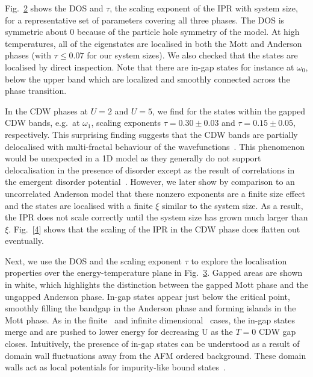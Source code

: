 Fig.~\protect\hyperlink{fig:indiv_IPR}{2} shows the {DOS} and \(\tau\), the scaling exponent of the IPR with system size, for a representative set of parameters covering all three phases. The DOS is symmetric about \(0\) because of the particle hole symmetry of the model. At high temperatures, all of the eigenstates are localised in both the Mott and Anderson phases (with \(\tau \leq 0.07\) for our system sizes). We also checked that the states are localised by direct inspection. Note that there are in-gap states for instance at \(\omega_0\), below the upper band which are localized and smoothly connected across the phase transition.

In the CDW phases at \(U=2\) and \(U=5\), we find for the states within the gapped CDW bands, e.g.~at \(\omega_1\), scaling exponents \(\tau = 0.30\pm0.03\) and \(\tau = 0.15\pm0.05\), respectively. This surprising finding suggests that the CDW bands are partially delocalised with multi-fractal behaviour of the wavefunctions~\autocite{eversAndersonTransitions2008a}. This phenomenon would be unexpected in a 1D model as they generally do not support delocalisation in the presence of disorder except as the result of correlations in the emergent disorder potential~\autocite{croyAndersonLocalization1D2011,goldshteinPurePointSpectrum1977}. However, we later show by comparison to an uncorrelated Anderson model that these nonzero exponents are a finite size effect and the states are localised with a finite \(\xi\) similar to the system size. As a result, the IPR does not scale correctly until the system size has grown much larger than \(\xi\). Fig.~{[}\protect\hyperlink{fig:indiv_IPR_disorder}{4}{]} shows that the scaling of the IPR in the CDW phase does flatten out eventually.

Next, we use the {DOS} and the scaling exponent \(\tau\) to explore the localisation properties over the energy-temperature plane in Fig.~\protect\hyperlink{fig:band_opening}{3}. Gapped areas are shown in white, which highlights the distinction between the gapped Mott phase and the ungapped Anderson phase. In-gap states appear just below the critical point, smoothly filling the bandgap in the Anderson phase and forming islands in the Mott phase. As in the finite~\autocite{zondaGaplessRegimeCharge2019} and infinite dimensional~\autocite{hassanSpectralPropertiesChargedensitywave2007} cases, the in-gap states merge and are pushed to lower energy for decreasing U as the \(T=0\) CDW gap closes. Intuitively, the presence of in-gap states can be understood as a result of domain wall fluctuations away from the AFM ordered background. These domain walls act as local potentials for impurity-like bound states~\autocite{zondaGaplessRegimeCharge2019}.

